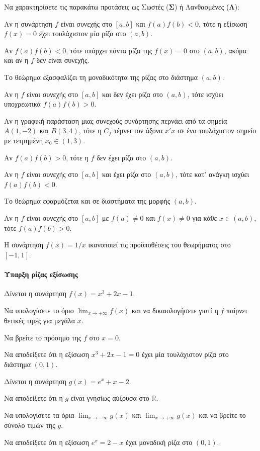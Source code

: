 \documentclass[11pt,a4paper,modern]{FFExercises}
\begin{document}
\askhsh
Να χαρακτηρίσετε τις παρακάτω προτάσεις ως Σωστές (\textbf{Σ}) ή Λανθασμένες (\textbf{Λ}):
\begin{alist}
    \item Αν η συνάρτηση $f$ είναι συνεχής στο $[a,b]$ και $f(a)f(b)<0$, τότε η εξίσωση $f(x)=0$ έχει τουλάχιστον μία ρίζα στο $(a,b)$.
    \item Αν $f(a)f(b)<0$, τότε υπάρχει πάντα ρίζα της $f(x)=0$ στο $(a,b)$, ακόμα και αν η $f$ δεν είναι συνεχής.
    \item Το θεώρημα  εξασφαλίζει τη μοναδικότητα της ρίζας στο διάστημα $(a,b)$.
    \item Αν η $f$ είναι συνεχής στο $[a,b]$ και δεν έχει ρίζα στο $(a,b)$, τότε ισχύει υποχρεωτικά $f(a)f(b)>0$.
    \item Αν η γραφική παράσταση μιας συνεχούς συνάρτησης περνάει από τα σημεία $A(1, -2)$ και $B(3, 4)$, τότε η $C_f$ τέμνει τον άξονα $x'x$ σε ένα τουλάχιστον σημείο με τετμημένη $x_0 \in (1,3)$.
    \item Αν $f(a)f(b)>0$, τότε η $f$ δεν έχει ρίζα στο $(a,b)$.
    \item Αν η $f$ είναι συνεχής στο $[a,b]$ και έχει ρίζα στο $(a,b)$, τότε κατ' ανάγκη ισχύει $f(a)f(b)<0$.
    \item Το θεώρημα  εφαρμόζεται και σε διαστήματα της μορφής $(a,b)$.
    \item Αν η $f$ είναι συνεχής στο $[a,b]$ με $f(a)\ne 0$ και $f(x)\ne 0$ για κάθε $x\in(a,b)$, τότε $f(a)f(b)>0$.
    \item Η συνάρτηση $f(x)=1/x$ ικανοποιεί τις προϋποθέσεις του θεωρήματος  στο $[-1,1]$. 
\end{alist}
\paragraph{Ύπαρξη ρίζας εξίσωσης}
\askhsh
Δίνεται η συνάρτηση $f(x)=x^3+2x-1$.
\begin{alist}
    \item Να υπολογίσετε το όριο $\lim_{x\to +\infty}f(x)$ και να δικαιολογήσετε γιατί η $f$ παίρνει θετικές τιμές για μεγάλα $x$.
    \item Να βρείτε το πρόσημο της $f$ στο $x=0$.
    \item Να αποδείξετε ότι η εξίσωση $x^3+2x-1=0$ έχει μία τουλάχιστον ρίζα στο διάστημα $(0,1)$.
\end{alist}

\askhsh
\askhsh
Δίνεται η συνάρτηση $g(x)=e^x+x-2$.
\begin{alist}
    \item Να αποδείξετε ότι η $g$ είναι γνησίως αύξουσα στο $\mathbb{R}$.
    \item Να υπολογίσετε τα όρια $\lim_{x\to -\infty}g(x)$ και $\lim_{x\to +\infty}g(x)$ και να βρείτε το σύνολο τιμών της $g$.
    \item Να αποδείξετε ότι η εξίσωση $e^x=2-x$ έχει μοναδική ρίζα στο $(0,1)$.
\end{alist}
\end{document}
